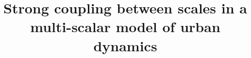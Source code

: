 \documentclass[referee,lineno,pdflatex,sn-apa]{sn-jnl}
\begin{document}
\title[Multi-scalar model of urban dynamics]{Strong coupling between scales in a multi-scalar model of urban dynamics}

\author{}










\end{document}
